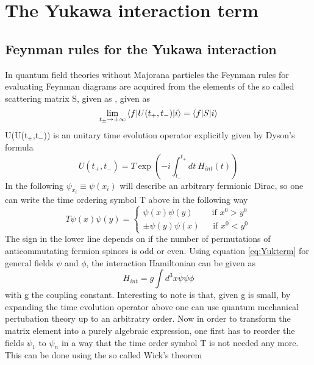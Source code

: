 \appendix
\chapter{The Yukawa interaction term}
\section{Feynman rules for the Yukawa interaction}
In quantum field theories without Majorana particles the Feynman rules for evaluating Feynman diagrams are acquired from the elements of the so called scattering matrix S, given as \cite[Eq. 3.26]{Tong:2006}, given as
\begin{equation}
\lim\limits_{t_\pm\rightarrow\pm\infty}\braket{f|U(t_+,t_-)|i}=\braket{f|S|i}
\label{eq:s-matrix}
\end{equation}
U(U(t$_+$,t$_-$)) is an unitary time evolution operator explicitly given by Dyson's formula
\begin{equation*}
	U(t_+,t_-)=T\exp\left(-i\int_{t_-}^{t_+}dt\:H_{int}(t)\right)
\end{equation*}
In the following $\psi_{x_i}\equiv\psi(x_i)$ will describe an arbitrary fermionic Dirac, so one can write the time ordering symbol T above in the following way
\begin{equation*}
	T\psi(x)\psi(y)=\left\{\begin{array}{c}\psi(x)\psi(y)\:\:\:\:\:\:\:\:\:\:\text{if } x^0>y^0\\\pm\psi(y)\psi(x)\:\:\:\:\:\:\:\text{if }x^0<y^0\end{array}\right.
	\end{equation*}
The sign in the lower line depends on if the number of permutations of anticommutating fermion spinors is odd or even. \newline
Using equation \ref{eq:Yukterm} for general fields $\psi$ and $\phi$, the interaction Hamiltonian can be given as
\begin{equation*}
	H_{int}=g\int d^3x \overline{\psi}\psi\phi
\end{equation*}
with g the coupling constant.\newline
Interesting to note is that, given g is small, by expanding the time evolution operator above one can use quantum mechanical pertubation theory up to an arbitratry order. \newline
Now in order to transform the matrix element into a purely algebraic expression, one first has to reorder the fields $\psi_1$ to $\psi_n$ in a way that the time order symbol T is not needed any more. This can be done using the so called Wick's theorem
